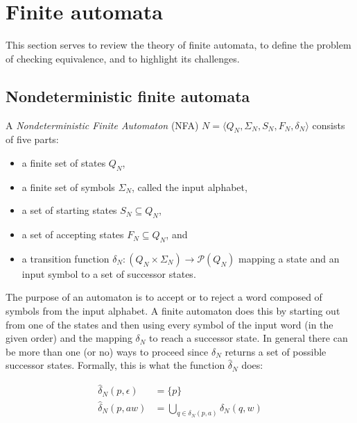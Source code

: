 \section{Finite automata}

This section serves to review the theory of finite automata, to define the
problem of checking equivalence, and to highlight its challenges.

\subsection{Nondeterministic finite automata}

\begin{definition}
  A \emph{Nondeterministic Finite Automaton} (NFA) $N = \langle Q_N, \Sigma_N, S_N, F_N, \delta_N \rangle$ consists of five parts:

  \begin{itemize}
    \item a finite set of states $Q_N$,
    \item a finite set of symbols $\Sigma_N$, called the input alphabet,
    \item a set of starting states $S_N \subseteq Q_N$,
    \item a set of accepting states $F_N \subseteq Q_N$, and
    \item a transition function $\delta_N : (Q_N \times \Sigma_N) \to \mathcal{P}(Q_N)$ mapping a state and an input symbol
            to a set of successor states.
  \end{itemize}
\end{definition}

The purpose of an automaton is to accept or to reject a word
composed of symbols from the input alphabet.
A finite automaton does this by starting out from one of the
states and then using every symbol of the input word (in the given
order) and the mapping $\delta_N$ to reach a successor state.
In general there can be more than one (or no) ways to proceed since $\delta_N$ returns a set of possible successor states.
Formally, this is what the function $\hat{\delta}_N$ does:

\begin{definition}
  \begin{align*}
    \hat{\delta}_N(p, \epsilon) &= \{p\}\\
    \hat{\delta}_N(p, aw) &= \bigcup_{q \in \delta_N(p, a)}\hat{\delta}_N(q, w)
  \end{align*}
\end{definition}

